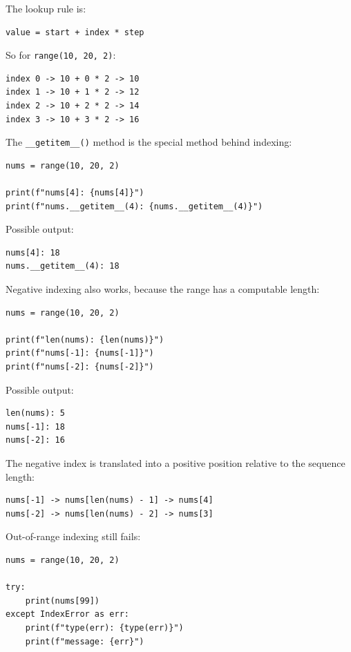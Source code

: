 The lookup rule is:

\begin{verbatim}
value = start + index * step
\end{verbatim}

So for \texttt{range(10, 20, 2)}:

\begin{verbatim}
index 0 -> 10 + 0 * 2 -> 10
index 1 -> 10 + 1 * 2 -> 12
index 2 -> 10 + 2 * 2 -> 14
index 3 -> 10 + 3 * 2 -> 16
\end{verbatim}

The \texttt{\_\_getitem\_\_()} method is the special method behind indexing:

\begin{verbatim}
nums = range(10, 20, 2)

print(f"nums[4]: {nums[4]}")
print(f"nums.__getitem__(4): {nums.__getitem__(4)}")
\end{verbatim}

Possible output:

\begin{verbatim}
nums[4]: 18
nums.__getitem__(4): 18
\end{verbatim}

Negative indexing also works, because the range has a computable length:

\begin{verbatim}
nums = range(10, 20, 2)

print(f"len(nums): {len(nums)}")
print(f"nums[-1]: {nums[-1]}")
print(f"nums[-2]: {nums[-2]}")
\end{verbatim}

Possible output:

\begin{verbatim}
len(nums): 5
nums[-1]: 18
nums[-2]: 16
\end{verbatim}

The negative index is translated into a positive position relative to the sequence length:

\begin{verbatim}
nums[-1] -> nums[len(nums) - 1] -> nums[4]
nums[-2] -> nums[len(nums) - 2] -> nums[3]
\end{verbatim}

Out-of-range indexing still fails:

\begin{verbatim}
nums = range(10, 20, 2)

try:
    print(nums[99])
except IndexError as err:
    print(f"type(err): {type(err)}")
    print(f"message: {err}")
\end{verbatim}

